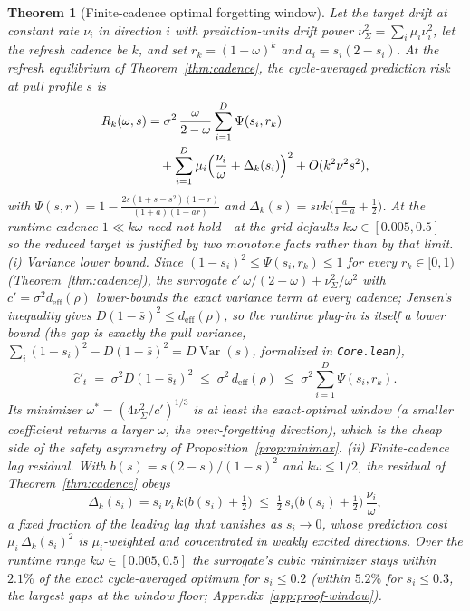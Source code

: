 \documentclass[10pt]{article}
\newtheorem{theorem}{Theorem}
\begin{document}
\begin{theorem}[Finite-cadence optimal forgetting window]
\label{thm:window}
Let the target drift at constant rate $\nu_i$ in direction $i$ with prediction-units drift power $\nu^2_\Sigma = \sum_i \mu_i \nu_i^2$, let the refresh cadence be $k$, and set $r_k = (1-\omega)^k$ and $a_i = s_i(2-s_i)$.
At the refresh equilibrium of Theorem~\ref{thm:cadence}, the cycle-averaged prediction risk at pull profile $s$ is
\[
\begin{aligned}
  R_k(\omega,s) &= \sigma^2\,\frac{\omega}{2-\omega}\sum_{i=1}^D \Psi(s_i,r_k) \\
  &\quad + \sum_{i=1}^D \mu_i\Bigl(\frac{\nu_i}{\omega} + \Delta_k(s_i)\Bigr)^2
  + O(k^2\nu^2 s^2),
\end{aligned}
\]
with $\Psi(s,r) = 1 - \frac{2s(1+s-s^2)(1-r)}{(1+a)(1-ar)}$ and $\Delta_k(s) = s\nu k\bigl(\frac{a}{1-a}+\frac12\bigr)$.
At the runtime cadence $1 \ll k\omega$ need not hold---at the grid defaults $k\omega \in [0.005, 0.5]$---so the reduced target is justified by two monotone facts rather than by that limit.
\emph{(i) Variance lower bound.}
Since $(1-s_i)^2 \le \Psi(s_i,r_k) \le 1$ for every $r_k \in [0,1)$ (Theorem~\ref{thm:cadence}), the surrogate $c'\,\omega/(2-\omega)+\nu^2_\Sigma/\omega^2$ with $c' = \sigma^2 d_{\mathrm{eff}}(\rho)$ lower-bounds the exact variance term at every cadence; Jensen's inequality gives $D(1-\bar s)^2 \le d_{\mathrm{eff}}(\rho)$, so the runtime plug-in is itself a lower bound (the gap is exactly the pull variance, $\sum_i(1-s_i)^2 - D(1-\bar s)^2 = D\operatorname{Var}(s)$, formalized in \texttt{Core.lean}),
\[
  \hat c'_t \;=\; \sigma^2 D(1-\bar s_t)^2 \;\le\; \sigma^2\,d_{\mathrm{eff}}(\rho) \;\le\; \sigma^2 \sum_{i=1}^D \Psi(s_i,r_k).
\]
Its minimizer $\omega^* = (4\nu^2_\Sigma/c')^{1/3}$ is at least the exact-optimal window (a smaller coefficient returns a larger $\omega$, the over-forgetting direction), which is the cheap side of the safety asymmetry of Proposition~\ref{prop:minimax}.
\emph{(ii) Finite-cadence lag residual.}
With $b(s) = s(2-s)/(1-s)^2$ and $k\omega \le 1/2$, the residual of Theorem~\ref{thm:cadence} obeys
\[
  \Delta_k(s_i) = s_i\,\nu_i\,k\bigl(b(s_i)+\tfrac12\bigr) \;\le\; \tfrac12\,s_i\bigl(b(s_i)+\tfrac12\bigr)\,\frac{\nu_i}{\omega},
\]
a fixed fraction of the leading lag that vanishes as $s_i \to 0$, whose prediction cost $\mu_i\,\Delta_k(s_i)^2$ is $\mu_i$-weighted and concentrated in weakly excited directions.
Over the runtime range $k\omega \in [0.005, 0.5]$ the surrogate's cubic minimizer stays within $2.1\%$ of the exact cycle-averaged optimum for $s_i \le 0.2$ (within $5.2\%$ for $s_i \le 0.3$, the largest gaps at the window floor; Appendix~\ref{app:proof-window}).

\end{theorem}
\end{document}
